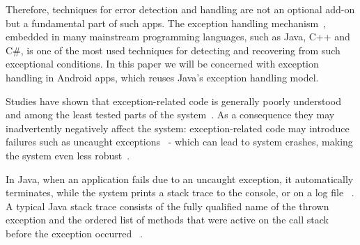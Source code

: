 \documentclass[conference]{IEEEtran}
\begin{document}
Therefore, techniques for error detection and handling are not  an optional add-on but a 
fundamental part of such apps. The exception handling mechanism~\cite{goodenough1975exception},
embedded in many mainstream programming languages, such as Java, C++ and C\#,
 is one of the most used techniques for detecting and recovering from such exceptional conditions.
In this paper we will be concerned with exception handling in Android apps,
which reuses Java's exception handling model.
 

Studies have shown that exception-related code is generally poorly understood and among the least tested parts of the system~\cite{miller1997issues,Robil00,shah2010understanding, 
garcia2007extracting,garcia2001comparative,cabral2007exception,coelho2011unveiling,yuan:2014.osdi}.
As a consequence they may inadvertently negatively affect the system: exception-related code may introduce failures such as 
uncaught exceptions~\cite{jo2004uncaught, Zhang12} - 
which can lead to system crashes, making the system even less robust~\cite{coelho2011unveiling}.

In Java, when an application fails due to an uncaught exception, 
it automatically terminates, while the system prints a stack trace to the console, 
or on a log file ~\cite{gosling2000java}.  A typical Java stack trace consists of  the fully qualified name 
of the thrown exception and the ordered list of methods that were active on the call stack before 
the exception occurred ~\cite{gosling2000java,bloch2008effective}.

\end{document}
